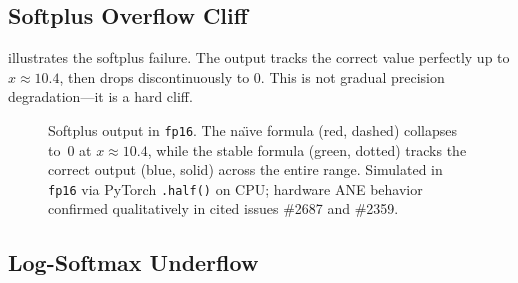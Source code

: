 \documentclass[10pt,twocolumn]{article}
\newcommand{\fp}{\texttt{fp16}}
\newcommand{\fpt}{\texttt{fp32}}
\newcommand{\ane}{ANE}
\begin{document}
\subsection{Softplus Overflow Cliff}
\label{sec:eval_softplus}

 illustrates the softplus failure.  The
output tracks the correct value perfectly up to $x \approx 10.4$,
then drops discontinuously to 0.  This is not gradual precision
degradation---it is a hard cliff.

\begin{figure}[h]
\centering
{}
\caption{Softplus output in \fp{}.  The na\"{\i}ve formula (red, dashed)
  collapses to~0 at $x \approx 10.4$, while the stable formula (green, dotted)
  tracks the correct output (blue, solid) across the entire range.  Simulated in
  \fp{} via PyTorch \texttt{.half()} on CPU; hardware \ane{} behavior confirmed
  qualitatively in cited issues \#2687 and \#2359.}
\label{fig:softplus_cliff}
\end{figure}

\subsection{Log-Softmax Underflow}
\label{sec:eval_logsoftmax}
\end{document}
